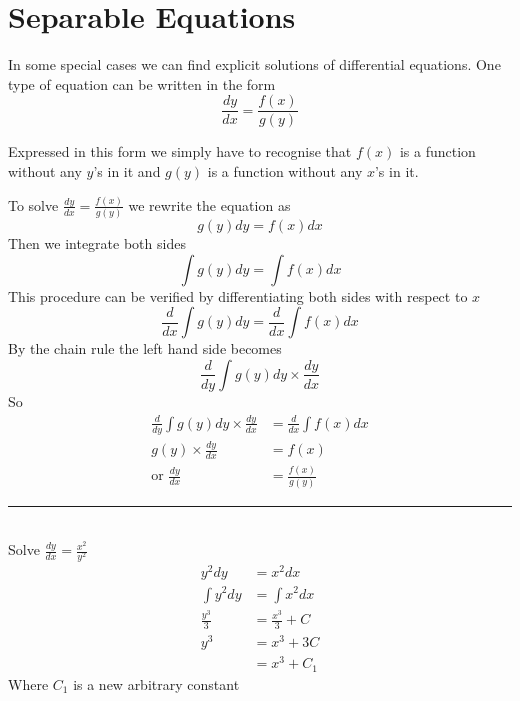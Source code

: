 \section{Separable Equations}
In some special cases we can find explicit solutions of differential equations. One type of equation can be written in the form
\begin{equation*}\frac{d y}{d x} =\frac{f (x)}{g (y)}
\end{equation*}

Expressed in this form we simply have to recognise that $f (x)$ is a function without any $y$'s in it and $g (y)$ is a function without any $x$'s in it. 

To solve $\frac{d y}{d x} =\frac{f (x)}{g (y)}$ we rewrite the equation as
\begin{equation*}g (y) d y =f (x) d x
\end{equation*}Then we integrate both sides
\begin{equation*}\int g (y) d y =\int f (x) d x
\end{equation*}This procedure can be verified by differentiating both sides with respect to $x$
\begin{equation*}\frac{d}{d x} \int g (y) d y =\frac{d}{d x} \int f (x) d x
\end{equation*}By the chain rule the left hand side becomes
\begin{equation*}\frac{d}{d y} \int g (y) d y \times \frac{d y}{d x}
\end{equation*}So
\begin{align*}\frac{d}{d y} \int g (y) d y \times \frac{d y}{d x} &    = \frac{d}{d x} \int f (x) d x \\
g (y) \times \frac{d y}{d x} &    = f (x) \\
\text{or\  \  \ }\frac{d y}{d x} &    = \frac{f (x)}{g (y)}\end{align*}
\rule{6.8cm}{0.5pt}\\
\example Solve $\displaystyle \frac{d y}{d x} =\frac{x^{2}}{y^{2}}$\medskip\\
\solution
\begin{align*}y^{2} d y &    = x^{2} d x \\
\int y^{2} d y &    = \int x^{2} d x \\
\frac{y^{3}}{3} &    = \frac{x^{3}}{3} +C \\
y^{3} &    = x^{3} +3 C \\
 &    = x^{3} +C_{1}\end{align*}Where $C_{1}$ is a new arbitrary constant
